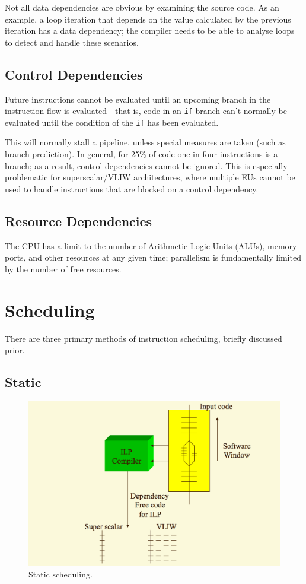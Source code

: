 Not all data dependencies are obvious by examining the source code. As an example, a loop iteration that depends on the value calculated by the previous iteration has a data dependency; the compiler needs to be able to analyse loops to detect and handle these scenarios.

\subsection{Control Dependencies}
Future instructions cannot be evaluated until an upcoming branch in the instruction flow is evaluated - that is, code in an \texttt{if} branch can't normally be evaluated until the condition of the \texttt{if} has been evaluated.

This will normally stall a pipeline, unless special measures are taken (such as branch prediction). In general, for 25\% of code one in four instructions is a branch; as a result, control dependencies cannot be ignored. This is especially problematic for superscalar/VLIW architectures, where multiple EUs cannot be used to handle instructions that are blocked on a control dependency.

\subsection{Resource Dependencies}
The CPU has a limit to the number of Arithmetic Logic Units (ALUs), memory ports, and other resources at any given time; parallelism is fundamentally limited by the number of free resources.

\section{Scheduling}
There are three primary methods of instruction scheduling, briefly discussed prior.

\subsection{Static}
\begin{figure}
\centering
\includegraphics[width=0.7\linewidth]{screenshot069}
\caption{Static scheduling.}
\label{fig:screenshot069}
\end{figure}

